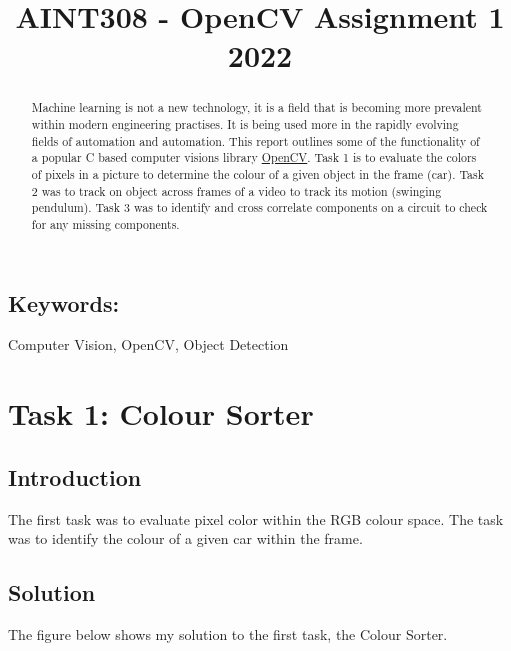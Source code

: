 \documentclass[conference]{IEEEtran}
\newcommand{\forceindent}{\leavevmode{\parindent=1em\indent}}
\begin{document}
\title{AINT308 - OpenCV Assignment 1 2022}

\author{
}

\maketitle

\begin{abstract}

Machine learning is not a new technology, it is a field that is becoming more prevalent within modern engineering practises. It is being used more in the rapidly evolving fields of automation and automation. This report outlines some of the functionality of a popular C based computer visions library \href{https://opencv.org}{OpenCV}. Task 1 is to evaluate the colors of pixels in a picture to determine the colour of a given object in the frame (car). Task 2 
was to track on object across frames of a video to track its motion (swinging pendulum). Task 3 was to identify and cross correlate components on a circuit to check for any missing components.

\end{abstract}

\subsection*{Keywords:} 
Computer Vision, OpenCV, Object Detection\\

\section{Task 1: Colour Sorter}	
\subsection{Introduction}
The first task was to evaluate pixel color within the RGB  colour space. The task was to identify the colour of a given car within the frame. 

\subsection{Solution}
\forceindent The figure below shows my solution to the first task, the Colour Sorter.
\end{document}
